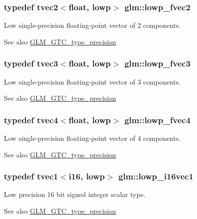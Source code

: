 \subsubsection[{lowp\+\_\+fvec2}]{\setlength{\rightskip}{0pt plus 5cm}typedef tvec2$<$float, lowp$>$ {\bf glm\+::lowp\+\_\+fvec2}}\label{namespaceglm_aa6bc4e1213ddd2faeec466bdc4b93711}
Low single-\/precision floating-\/point vector of 2 components. \begin{DoxySeeAlso}{See also}
\hyperlink{group__gtc__type__precision}{G\+L\+M\+\_\+\+G\+T\+C\+\_\+type\+\_\+precision} 
\end{DoxySeeAlso}
\hypertarget{namespaceglm_ae5d208494ff088d05d8d9891f1983af8}{}
\subsubsection[{lowp\+\_\+fvec3}]{\setlength{\rightskip}{0pt plus 5cm}typedef tvec3$<$float, lowp$>$ {\bf glm\+::lowp\+\_\+fvec3}}\label{namespaceglm_ae5d208494ff088d05d8d9891f1983af8}
Low single-\/precision floating-\/point vector of 3 components. \begin{DoxySeeAlso}{See also}
\hyperlink{group__gtc__type__precision}{G\+L\+M\+\_\+\+G\+T\+C\+\_\+type\+\_\+precision} 
\end{DoxySeeAlso}
\hypertarget{namespaceglm_a243b3e1a29e946252ca074dfdf87459b}{}
\subsubsection[{lowp\+\_\+fvec4}]{\setlength{\rightskip}{0pt plus 5cm}typedef tvec4$<$float, lowp$>$ {\bf glm\+::lowp\+\_\+fvec4}}\label{namespaceglm_a243b3e1a29e946252ca074dfdf87459b}
Low single-\/precision floating-\/point vector of 4 components. \begin{DoxySeeAlso}{See also}
\hyperlink{group__gtc__type__precision}{G\+L\+M\+\_\+\+G\+T\+C\+\_\+type\+\_\+precision} 
\end{DoxySeeAlso}
\hypertarget{namespaceglm_a30a0933d1522614046808478a3bc2047}{}
\subsubsection[{lowp\+\_\+i16vec1}]{\setlength{\rightskip}{0pt plus 5cm}typedef tvec1$<${\bf i16}, lowp$>$ {\bf glm\+::lowp\+\_\+i16vec1}}\label{namespaceglm_a30a0933d1522614046808478a3bc2047}
Low precision 16 bit signed integer scalar type. \begin{DoxySeeAlso}{See also}
\hyperlink{group__gtc__type__precision}{G\+L\+M\+\_\+\+G\+T\+C\+\_\+type\+\_\+precision} 
\end{DoxySeeAlso}
\hypertarget{namespaceglm_aaa886fe5fe83a35f45959eb90f73ba17}{}
